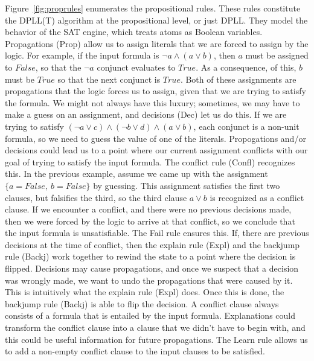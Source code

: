 \documentclass{article}
\begin{document}
Figure~\ref{fig:proprules} enumerates the propositional rules.
These rules constitute the DPLL(T) algorithm at the
propositional level, or just DPLL.
They model the behavior of the SAT engine, 
which treats atoms
as Boolean variables. Propagations (Prop) allow us to assign 
literals that we are forced to assign by the logic. 
For example, if the input formula is $\neg a \land (a \lor b)$, 
then $a$ must be assigned to $False$, so that the $\neg a$ 
conjunct evaluates to $True$. As a consequence, of this, 
$b$ must be $True$ so that the next conjunct is $True$. Both 
of these assignments are propagations that the logic forces 
us to assign, given that we are trying to satisfy the formula.
We might not always have this luxury; sometimes, we may have 
to make a guess on an assignment, and decisions (Dec) let us do 
this. If we are trying to satisfy 
$(\neg a \lor c) \land (\neg b \lor d) \land (a \lor b)$,
each conjunct is a non-unit
formula, so we need to guess the value of one of the literals. 
Propogations and/or decisions could lead us to 
a point where our current assignment conflicts with 
our goal of trying to satisfy the input formula. The 
conflict rule (Confl) recognizes this. In the previous 
example, assume we came up with the assignment 
$\{a = False,\ b = False\}$ by guessing. This assignment 
satisfies the first two clauses, but falsifies the third, 
so the third clause 
$a \lor b$ is recognized as a conflict clause.
If we encounter a conflict, 
and there were no previous decisions made, then we were 
forced by the logic to arrive at that conflict, so we 
conclude that the input formula is unsatisfiable. The Fail 
rule ensures this. If, there are previous decisions at
the time of conflict, then the explain rule (Expl) 
and the backjump rule (Backj) work together to rewind 
the state to a point where the decision is flipped. 
Decisions may cause propagations, and once we suspect that 
a decision was wrongly made, we want to undo the 
propagations that were caused by it. This is intuitively 
what the explain rule (Expl) does. Once this is done, 
the backjump rule (Backj) is able to flip the decision. 
A conflict clause always 
consists of a formula that is entailed by the input formula. 
Explanations could transform the conflict 
clause into a clause that we didn't have to begin with, 
and this could be useful information for future propagations. 
The Learn rule allows us 
to add a non-empty conflict clause to the input clauses to be 
satisfied. 
\end{document}

